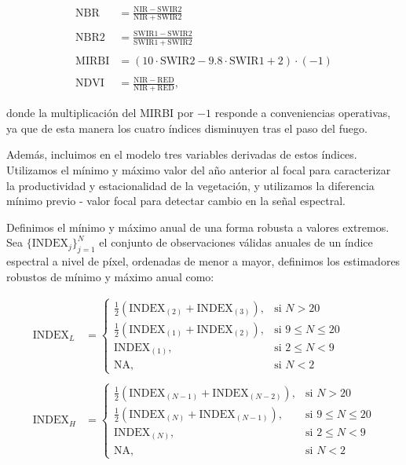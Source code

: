 \documentclass[11pt,a4paper]{article}
\begin{document}
\begin{equation*}
  \begin{aligned}
    \mathrm{NBR} &= \frac{\mathrm{NIR} - \mathrm{SWIR2}}{\mathrm{NIR} + \mathrm{SWIR2}} \\
    \\
    \mathrm{NBR2} &= \frac{\mathrm{SWIR1} - \mathrm{SWIR2}}{\mathrm{SWIR1} + \mathrm{SWIR2}} \\
    \\
    \mathrm{MIRBI} &= (10 \cdot \mathrm{SWIR2} - 9.8 \cdot \mathrm{SWIR1} + 2) \cdot (-1)\\
    \\
    \mathrm{NDVI} &= \frac{\mathrm{NIR} - \mathrm{RED}}{\mathrm{NIR} + \mathrm{RED}}\text{,}
  \end{aligned}
\end{equation*}

\noindent donde la multiplicación del MIRBI por $-1$ responde a conveniencias operativas, ya que de esta manera los cuatro índices disminuyen tras el paso del fuego.

Además, incluimos en el modelo tres variables derivadas de estos índices. Utilizamos el mínimo y máximo valor del año anterior al focal para caracterizar la productividad y estacionalidad de la vegetación, y utilizamos la diferencia mínimo previo - valor focal para detectar cambio en la señal espectral.

Definimos el mínimo y máximo anual de una forma robusta a valores extremos. Sea $\{ \mathrm{INDEX}_j \}_{j=1}^{N}$ el conjunto de observaciones válidas anuales de un índice espectral a nivel de píxel, ordenadas de menor a mayor, definimos los estimadores robustos de mínimo y máximo anual como:

\begin{equation}
  \begin{aligned}
    \mathrm{INDEX}_L &=
    \begin{cases}
      \frac{1}{2}\left( \mathrm{INDEX}_{(2)} + \mathrm{INDEX}_{(3)} \right), & \text{si } N > 20 \\
      \frac{1}{2}\left( \mathrm{INDEX}_{(1)} + \mathrm{INDEX}_{(2)} \right), & \text{si } 9 \le N \le 20 \\
      \mathrm{INDEX}_{(1)}, & \text{si } 2 \le N < 9 \\
      \mathrm{NA}, & \text{si } N < 2
    \end{cases} \\
    \\
    \mathrm{INDEX}_H &=
    \begin{cases}
      \frac{1}{2}\left( \mathrm{INDEX}_{(N-1)} + \mathrm{INDEX}_{(N-2)} \right), & \text{si } N > 20 \\
      \frac{1}{2}\left( \mathrm{INDEX}_{(N)} + \mathrm{INDEX}_{(N-1)} \right), & \text{si } 9 \le N \le 20 \\
      \mathrm{INDEX}_{(N)}, & \text{si } 2 \le N < 9 \\
      \mathrm{NA}, & \text{si } N < 2
    \end{cases}
  \end{aligned}
  \label{eq-min-max}
\end{equation}
\end{document}
